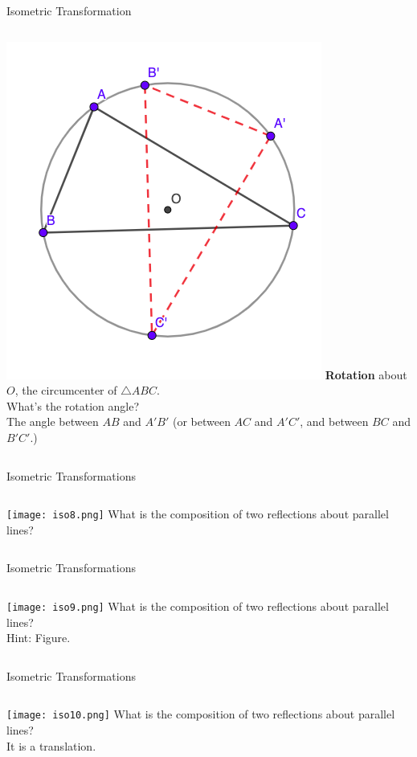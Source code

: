 \documentclass{beamer}
\begin{document}
\begin{frame}{Isometric Transformation}
	\begin{columns}
		\includegraphics[scale=0.4]{iso7.png}
		\textbf{Rotation} about $O$, the circumcenter of 
		$\triangle ABC$.\\
		\phantom{Spacing}
		What's the rotation angle?\\
		\phantom{Spacing}
		The angle between $AB$ and $A'B'$ (or between $AC$ and
		$A'C'$, and between $BC$ and $B'C'$.)
	\end{columns}
\end{frame}
\begin{frame}{Isometric Transformations}
	\begin{columns}
		\column{0.6\textwidth}
		\texttt{[image: iso8.png]}
		\column{0.4\textwidth}
		What is the composition of two reflections about parallel
		lines?
	\end{columns}
\end{frame}
\begin{frame}{Isometric Transformations}
	\begin{columns}
		\texttt{[image: iso9.png]}
		What is the composition of two reflections about parallel
		lines?\\
		\phantom{Spacing}
		Hint: Figure.
	\end{columns}
\end{frame}
\begin{frame}{Isometric Transformations}
	\begin{columns}
		\column{0.6\textwidth}
		\texttt{[image: iso10.png]}
		\column{0.4\textwidth}
		What is the composition of two reflections about parallel
		lines?\\
		\phantom{Spacing}
		It is a translation.
	\end{columns}
\end{frame}
\end{document}
